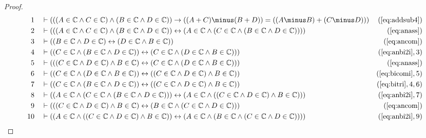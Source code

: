 \begin{proof}
\begin{align}
  1 &&  & \vdash ( ( ( A \in \mathbb{C} \wedge C \in \mathbb{C} ) \wedge ( B \in \mathbb{C} \wedge D \in \mathbb{C} ) ) \rightarrow ( ( A + C ) \minus ( B + D ) ) = ( ( A \minus B ) + ( C \minus D ) ) )&(\mbox{\ref{eq:addsub4}})\notag
  \\ 2 &&  & \vdash ( ( ( A \in \mathbb{C} \wedge C \in \mathbb{C} ) \wedge ( B \in \mathbb{C} \wedge D \in \mathbb{C} ) ) \leftrightarrow ( A \in \mathbb{C} \wedge ( C \in \mathbb{C} \wedge ( B \in \mathbb{C} \wedge D \in \mathbb{C} ) ) ) )&(\mbox{\ref{eq:anass}})\notag
  \\ 3 &&  & \vdash ( ( B \in \mathbb{C} \wedge D \in \mathbb{C} ) \leftrightarrow ( D \in \mathbb{C} \wedge B \in \mathbb{C} ) )&(\mbox{\ref{eq:ancom}})\notag
  \\ 4 &&  & \vdash ( ( C \in \mathbb{C} \wedge ( B \in \mathbb{C} \wedge D \in \mathbb{C} ) ) \leftrightarrow ( C \in \mathbb{C} \wedge ( D \in \mathbb{C} \wedge B \in \mathbb{C} ) ) )&(\mbox{\ref{eq:anbi2i}},3)\notag
  \\ 5 &&  & \vdash ( ( ( C \in \mathbb{C} \wedge D \in \mathbb{C} ) \wedge B \in \mathbb{C} ) \leftrightarrow ( C \in \mathbb{C} \wedge ( D \in \mathbb{C} \wedge B \in \mathbb{C} ) ) )&(\mbox{\ref{eq:anass}})\notag
  \\ 6 &&  & \vdash ( ( C \in \mathbb{C} \wedge ( D \in \mathbb{C} \wedge B \in \mathbb{C} ) ) \leftrightarrow ( ( C \in \mathbb{C} \wedge D \in \mathbb{C} ) \wedge B \in \mathbb{C} ) )&(\mbox{\ref{eq:bicomi}},5)\notag
  \\ 7 &&  & \vdash ( ( C \in \mathbb{C} \wedge ( B \in \mathbb{C} \wedge D \in \mathbb{C} ) ) \leftrightarrow ( ( C \in \mathbb{C} \wedge D \in \mathbb{C} ) \wedge B \in \mathbb{C} ) )&(\mbox{\ref{eq:bitri}},4,6)\notag
  \\ 8 &&  & \vdash ( ( A \in \mathbb{C} \wedge ( C \in \mathbb{C} \wedge ( B \in \mathbb{C} \wedge D \in \mathbb{C} ) ) ) \leftrightarrow ( A \in \mathbb{C} \wedge ( ( C \in \mathbb{C} \wedge D \in \mathbb{C} ) \wedge B \in \mathbb{C} ) ) )&(\mbox{\ref{eq:anbi2i}},7)\notag
  \\ 9 &&  & \vdash ( ( ( C \in \mathbb{C} \wedge D \in \mathbb{C} ) \wedge B \in \mathbb{C} ) \leftrightarrow ( B \in \mathbb{C} \wedge ( C \in \mathbb{C} \wedge D \in \mathbb{C} ) ) )&(\mbox{\ref{eq:ancom}})\notag
  \\ 10 &&  & \vdash ( ( A \in \mathbb{C} \wedge ( ( C \in \mathbb{C} \wedge D \in \mathbb{C} ) \wedge B \in \mathbb{C} ) ) \leftrightarrow ( A \in \mathbb{C} \wedge ( B \in \mathbb{C} \wedge ( C \in \mathbb{C} \wedge D \in \mathbb{C} ) ) ) )&(\mbox{\ref{eq:anbi2i}},9)\notag

\end{align}
\end{proof}
